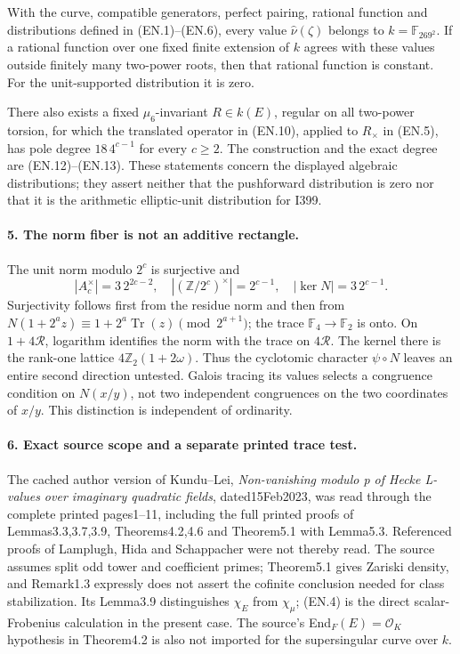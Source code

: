\begin{proposition}
\label{AC-G181}
With the curve, compatible generators, perfect pairing, rational
function and distributions defined in (EN.1)--(EN.6), every value
$\widehat\nu(\zeta)$ belongs to $k=\mathbb F_{269^2}$.
If a rational function over one fixed finite extension of $k$
agrees with these values outside finitely many two-power roots,
then that rational function is constant.  For the unit-supported
distribution it is zero.

There also exists a fixed $\mu_6$-invariant $R\in k(E)$, regular
on all two-power torsion, for which the translated operator
in (EN.10), applied to $R_\times$ in (EN.5), has pole degree
$18\,4^{c-1}$ for every $c\geq2$.
The construction and the exact degree are (EN.12)--(EN.13).
These statements concern the displayed algebraic distributions;
they assert neither that the pushforward distribution is zero nor
that it is the arithmetic elliptic-unit distribution for I399.
\end{proposition}

\paragraph{5. The norm fiber is not an additive rectangle.}
The unit norm modulo $2^c$ is surjective and
\[
 |A_c^\times|=3\,2^{2c-2},\quad
 |(\mathbb Z/2^c)^\times|=2^{c-1},\quad
 |\ker N|=3\,2^{c-1}.                                       \tag{EN.14}
\]
Surjectivity follows first from the residue norm and then from
$N(1+2^a z)\equiv1+2^a\operatorname{Tr}(z)\pmod{2^{a+1}}$;
the trace $\mathbb F_4\to\mathbb F_2$ is onto.
On $1+4\mathcal R$, logarithm identifies the norm with the trace on
$4\mathcal R$.  The kernel there is the rank-one lattice
$4\mathbb Z_2(1+2\omega)$.
Thus the cyclotomic character $\psi\circ N$ leaves an entire second
direction untested.  Galois tracing its values selects a congruence
condition on $N(x/y)$, not two independent congruences on the two
coordinates of $x/y$.  This distinction is independent of ordinarity.

\paragraph{6. Exact source scope and a separate printed trace test.}
The cached author version of Kundu--Lei, \emph{Non-vanishing modulo p
of Hecke L-values over imaginary quadratic fields}, dated15Feb2023,
was read through the complete printed pages1--11, including the full
printed proofs of Lemmas3.3,3.7,3.9, Theorems4.2,4.6 and Theorem5.1
with Lemma5.3.  Referenced proofs of Lamplugh, Hida and Schappacher
were not thereby read.  The source assumes split odd tower and
coefficient primes; Theorem5.1 gives Zariski density, and Remark1.3
expressly does not assert the cofinite conclusion needed for class
stabilization.  Its Lemma3.9 distinguishes $\chi_E$ from $\chi_\mu$;
(EN.4) is the direct scalar-Frobenius calculation in the present case.
The source's End$_F(E)=\mathcal O_K$ hypothesis in Theorem4.2 is also
not imported for the supersingular curve over $k$.

